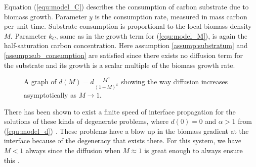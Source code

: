 Equation (\ref{equ:model_C}) describes the consumption of carbon substrate due to biomass growth.
Parameter $y$ is the consumption rate, measured in mass carbon per unit time.
Substrate consumption is proportional to the local biomass density $M$. 
Parameter $k_C$, same as in the growth term for (\ref{equ:model_M}), is again the half-saturation carbon concentration.
Here assumption \ref{assump:substratum} and \ref{assump:sub_consumption} are satisfied since there exists no diffusion term for the substrate and its growth is a scalar multiple of the biomass growth rate.


\begin{figure}
  \centering
  \caption{A graph of $d(M) = d \frac{M^\alpha}{(1 - M)^\beta}$ showing the way diffusion increases asymptotically as $M \to 1$.}
  \label{fig:show_d}
\end{figure}

There has been shown to exist a finite speed of interface propagation for the solutions of these kinds of degenerate problems, where $d(0) = 0$ and $\alpha >1$ from (\ref{equ:model_d}) \citep{jalbert2014numerical}.
These problems have a blow up in the biomass gradient at the interface because of the degeneracy that exists there.
For this system, we have $M < 1$ always since the diffusion when $M \approx 1$ is great enough to always ensure this \citep{jalbert2014numerical}.

